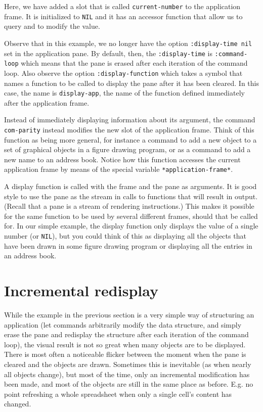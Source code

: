 

Here, we have added a slot that is called \texttt{current-number} to
the application frame.  It is initialized to \texttt{NIL} and it has
an accessor function that allow us to query and to modify the value.

Observe that in this example, we no longer have the option
\texttt{:display-time nil} set in the application pane.  By default,
then, the \texttt{:display-time} is \texttt{:command-loop} which means
that the pane is erased after each iteration of the command loop.
Also observe the option \texttt{:display-function} which takes a
symbol that names a function to be called to display the pane after it
has been cleared.  In this case, the name is \texttt{display-app}, the
name of the function defined immediately after the application frame.

Instead of immediately displaying information about its argument, the
command \texttt{com-parity} instead modifies the new slot of the
application frame.  Think of this function as being more general, for
instance a command to add a new object to a set of graphical objects
in a figure drawing program, or as a command to add a new name to an
address book.  Notice how this function accesses the current
application frame by means of the special variable
\texttt{*application-frame*}.

A display function is called with the frame and the pane as arguments.
It is good style to use the pane as the stream in calls to functions
that will result in output.  (Recall that a pane is a stream of
rendering instructions.) This makes it possible for the same function
to be used by several different frames, should that be called for.  In
our simple example, the display function only displays the value of a
single number (or \texttt{NIL}), but you could think of this as
displaying all the objects that have been drawn in some figure drawing
program or displaying all the entries in an address book.

\section{Incremental redisplay}

While the example in the previous section is a very simple way of
structuring an application (let commands arbitrarily modify the data
structure, and simply erase the pane and redisplay the structure after
each iteration of the command loop), the visual result is not so great
when many objects are to be displayed.  There is most often a
noticeable flicker between the moment when the pane is cleared and the
objects are drawn.  Sometimes this is inevitable (as when nearly all
objects change), but most of the time, only an incremental
modification has been made, and most of the objects are still in the
same place as before. E.g. no point refreshing a whole spreadsheet
when only a single cell's content has changed.

